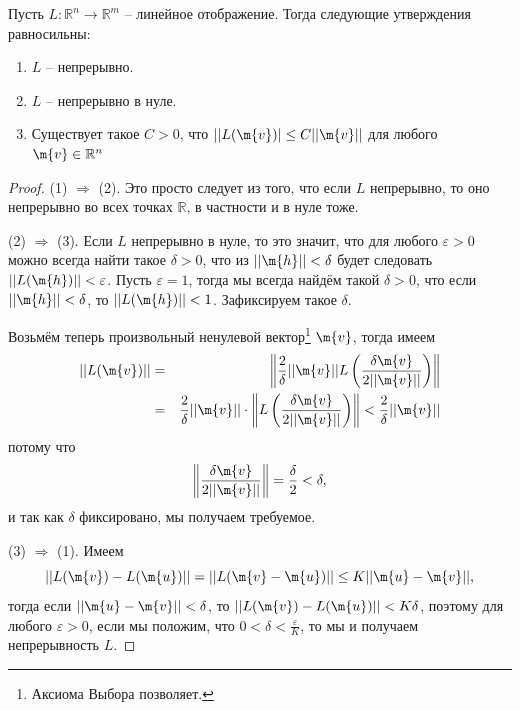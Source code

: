 \begin{proposition}\label{contous_of_linear}
    Пусть $L: \mathbb{R}^n \to \mathbb{R}^m$ -- линейное отображение. Тогда следующие утверждения равносильны:
    \begin{enumerate}
        \item $L$ -- непрерывно.
        \item $L$ -- непрерывно в нуле.
        \item Существует такое $C > 0$, что $|| L(\m{v})| \le C ||\m{v}||$ для любого $\m{v} \in \mathbb{R}^n$
    \end{enumerate}
\end{proposition}
\begin{proof}
(1) $\Longrightarrow$ (2). Это просто следует из того, что если $L$ непрерывно, то оно непрерывно во всех точках $\mathbb{R}$, в частности и в нуле тоже.

(2) $\Longrightarrow$ (3). Если $L$ непрерывно в нуле, то это значит, что для любого $\varepsilon >0$ можно всегда найти такое $\delta>0$, что из $||\m{h}|| <\delta$ будет следовать $||L(\m{h})|| <\varepsilon$. Пусть $\varepsilon = 1$, тогда мы всегда найдём такой $\delta>0$, что если $|| \m{h} || < \delta$, то $|| L(\m{h})|| < 1$. Зафиксируем такое $\delta.$

Возьмём теперь произвольный ненулевой вектор\footnote{Аксиома Выбора позволяет.} $\m{v}$, тогда имеем
\begin{eqnarray*}
 || L(\m{v}) || &=& \left\| \frac{2}{\delta} || \m{v} || L\left(  \frac{\delta \m{v}}{2 || \m{v} ||}\right) \right\| \\
 &=&  \frac{2}{\delta} || \m{v}|| \cdot \left\| L\left(  \frac{\delta \m{v}}{2 || \m{v} ||}\right) \right\| < \frac{2}{\delta} || \m{v}||
\end{eqnarray*}
потому что 
\[
 \left\|\frac{\delta \m{v}}{2 || \m{v} ||} \right\| = \frac{\delta}{2} < \delta,
\]
и так как $\delta$ фиксировано, мы получаем требуемое.

(3) $\Longrightarrow$ (1). Имеем
\[
 || L(\m{v}) - L(\m{u}) || = || L(\m{v} - \m{u}) || \le K || \m{u} - \m{v} ||,
\]
тогда если $||\m{u} - \m{v}|| < \delta$, то $|| L(\m{v}) - L(\m{u}) ||< K \delta$,
поэтому для любого $\varepsilon >0$, если мы положим, что $0<\delta < \frac{\varepsilon}{K}$, то мы и получаем непрерывность $L$.
\end{proof}





